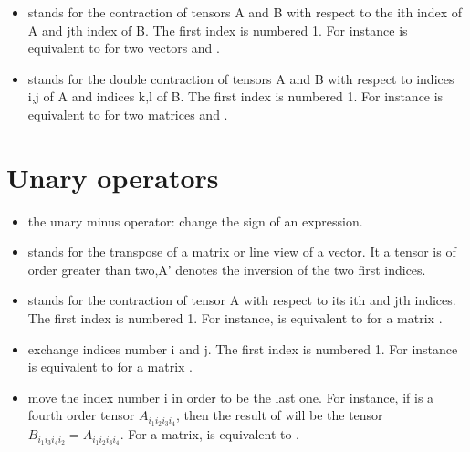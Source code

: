 \documentclass[a4paper,11pt,english]{sphinxmanual}
\begin{document}
\begin{itemize}
\item {} 
 stands for the contraction of tensors A and B with respect to the ith index of A and jth index of B. The first index is numbered 1. For instance  is equivalent to  for two vectors  and .

\item {} 
 stands for the double contraction of tensors A and B with respect to indices i,j of A and indices k,l of B. The first index is numbered 1. For instance  is equivalent to  for two matrices  and .

\end{itemize}


\section{Unary operators}
\label{\detokenize{userdoc/gasm_high:unary-operators}}\begin{itemize}
\item {} 
\sphinxcode{\sphinxupquote{\sphinxhyphen{}}} the unary minus operator: change the sign of an expression.

\item {} 
\sphinxcode{\sphinxupquote{\textquotesingle{}}} stands for the transpose of a matrix or line view of a vector. It a tensor  is of order greater than two,\textasciigrave{}\textasciigrave{}A’\textasciigrave{}\textasciigrave{} denotes the inversion of the two first indices.

\item {} 
 stands for the contraction of tensor A with respect to its ith and jth indices. The first index is numbered 1. For instance,  is equivalent to  for a matrix .

\item {} 
 exchange indices number i and j. The first index is numbered 1. For instance  is equivalent to  for a matrix .

\item {} 
 move the index number i in order to be the last one. For instance, if  is a fourth order tensor \(A_{i_1i_2i_3i_4}\), then the result of  will be the tensor \(B_{i_1i_3i_4i_2} = A_{i_1i_2i_3i_4}\). For a matrix,  is equivalent to .

\end{itemize}
\end{document}
